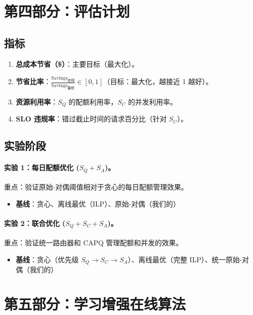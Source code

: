 \documentclass[11pt]{article}
\begin{document}
\section{第四部分：评估计划}
\label{sec:part4}

\subsection{指标}
\begin{enumerate}
  \item \textbf{总成本节省（\$）}：主要目标（最大化）。
  \item \textbf{节省比率}：$\frac{\text{Savings}_{\text{在线}}}{\text{Savings}_{\text{最优}}} \in [0, 1]$（目标：最大化，越接近 1 越好）。
  \item \textbf{资源利用率}：$S_Q$ 的配额利用率，$S_C$ 的并发利用率。
  \item \textbf{SLO 违规率}：错过截止时间的请求百分比（针对 $S_C$）。
\end{enumerate}

\subsection{实验阶段}

\paragraph{实验 1：每日配额优化 ($S_Q + S_A$)。}
重点：验证原始-对偶阈值相对于贪心的每日配额管理效果。
\begin{itemize}
  \item \textbf{基线}：贪心、离线最优（ILP）、原始-对偶（我们的）
\end{itemize}

\paragraph{实验 2：联合优化 ($S_Q + S_C + S_A$)。}
重点：验证统一路由器和 CAPQ 管理配额和并发的效果。
\begin{itemize}
  \item \textbf{基线}：贪心（优先级 $S_Q \to S_C \to S_A$）、离线最优（完整 ILP）、统一原始-对偶（我们的）
\end{itemize}

\section{第五部分：学习增强在线算法}
\label{sec:part5}
\end{document}
